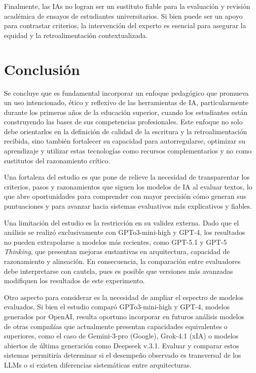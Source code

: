 \documentclass[spanish]{textolivre}
\begin{document}
Finalmente, las IAs no logran ser un sustituto fiable para la evaluación y revisión académica de ensayos de estudiantes universitarios. Si bien puede ser un apoyo para contrastar criterios, la intervención del experto es esencial para asegurar la equidad y la retroalimentación contextualizada.

\section{Conclusión}
Se concluye que es fundamental incorporar un enfoque pedagógico que promueva un uso intencionado, ético y reflexivo de las herramientas de IA, particularmente durante los primeros años de la educación superior, cuando los estudiantes están construyendo las bases de sus competencias profesionales. Este enfoque no solo debe orientarlos en la definición de calidad de la escritura y la retroalimentación recibida, sino también fortalecer su capacidad para autorregularse, optimizar su aprendizaje y utilizar estas tecnologías como recursos complementarios y no como sustitutos del razonamiento crítico.

Una fortaleza del estudio es que pone de relieve la necesidad de transparentar los criterios, pasos y razonamientos que siguen los modelos de IA al evaluar textos, lo que abre oportunidades para comprender con mayor precisión cómo generan sus puntuaciones y para avanzar hacia sistemas evaluativos más explicativos y fiables.

Una limitación del estudio es la restricción en su validez externa. Dado que el análisis se realizó exclusivamente con GPTo3-mini-high y GPT-4, los resultados no pueden extrapolarse a modelos más recientes, como GPT-5.1 y GPT-5 \textit{Thinking}, que presentan mejoras sustantivas en arquitectura, capacidad de razonamiento y alineación. En consecuencia, la comparación entre evaluadores debe interpretarse con cautela, pues es posible que versiones más avanzadas modifiquen los resultados de este experimento.

Otro aspecto para considerar es la necesidad de ampliar el espectro de modelos evaluados. Si bien el estudio comparó GPTo3-mini-high y GPT-4, modelos generados por OpenAI, resulta oportuno incorporar en futuros análisis modelos de otras compañías que actualmente presentan capacidades equivalentes o superiores, como el caso de Gemini-3-pro (Google), Grok-4.1 (xIA) o modelos abiertos de última generación como Deepseek v.3.1. Evaluar y comparar estos sistemas permitiría determinar si el desempeño observado es transversal de los LLMs o si existen diferencias sistemáticas entre arquitecturas.
\end{document}
